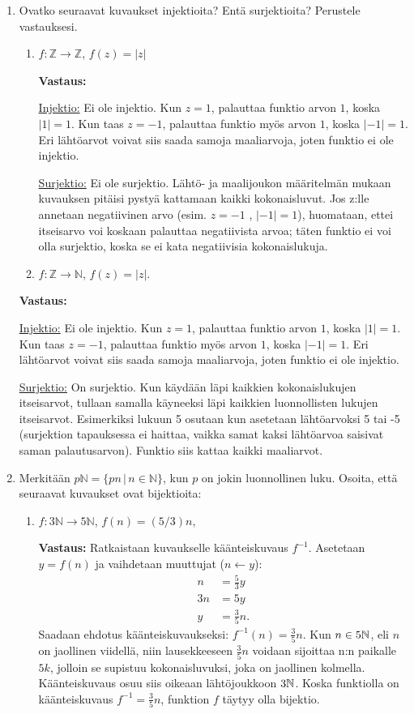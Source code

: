 \documentclass[a4paper,12pt]{article}
\begin{document}
\begin{enumerate}
\item Ovatko seuraavat kuvaukset injektioita? Ent\"a surjektioita? Perustele vastauksesi.
\begin{enumerate}
\item $f: \mathbb{Z} \to \mathbb{Z}$, $f(z)=\vert z \vert$

\textbf{Vastaus:} 

\underline{Injektio:} Ei ole injektio. Kun $z=1$, palauttaa funktio arvon $1$, koska $|1|=1$. Kun taas $z=-1$, palauttaa funktio myös arvon $1$, koska $|-1|=1$. Eri lähtöarvot voivat siis saada samoja maaliarvoja, joten funktio ei ole injektio. 

\underline{Surjektio:} Ei ole surjektio. Lähtö- ja maalijoukon määritelmän mukaan kuvauksen pitäisi pystyä kattamaan kaikki kokonaisluvut. Jos z:lle annetaan negatiivinen arvo (esim. $z=-1$ , $|-1| = 1$), huomataan, ettei itseisarvo voi koskaan palauttaa negatiivista arvoa; täten funktio ei voi olla surjektio, koska se ei kata negatiivisia kokonaislukuja. 

\item $f: \mathbb{Z} \to \mathbb{N}$, $f(z)=\vert z \vert$. \\
\end{enumerate}

\textbf{Vastaus:} 

\underline{Injektio:} Ei ole injektio. Kun $z=1$, palauttaa funktio arvon $1$, koska $|1|=1$. Kun taas $z=-1$, palauttaa funktio myös arvon $1$, koska $|-1|=1$. Eri lähtöarvot voivat siis saada samoja maaliarvoja, joten funktio ei ole injektio. 

\underline{Surjektio:} On surjektio. Kun käydään läpi kaikkien kokonaislukujen itseisarvot, tullaan samalla käyneeksi läpi kaikkien luonnollisten lukujen itseisarvot. Esimerkiksi lukuun 5 osutaan kun asetetaan lähtöarvoksi 5 tai -5 (surjektion tapauksessa ei haittaa, vaikka samat kaksi lähtöarvoa saisivat saman palautusarvon). Funktio siis kattaa kaikki maaliarvot. 

\item Merkit\"a\"an $p\mathbb{N}=\{pn \, | \, n \in \mathbb{N}\}$, kun $p$ on jokin luonnollinen luku.
Osoita, ett\"a seuraavat kuvaukset ovat bijektioita:
\begin{enumerate}
\item $f: 3\mathbb{N} \to 5\mathbb{N}$, $f(n)=(5/3)n$,

\textbf{Vastaus:} Ratkaistaan kuvaukselle käänteiskuvaus $f^{-1}$. Asetetaan $y=f(n)$ ja vaihdetaan muuttujat ($n \leftarrow y$):
\begin{align*}
    n&=\frac{5}{3}y\\
     3n&=5y\\
     y&=\frac{3}{5}n.
\end{align*}
Saadaan ehdotus käänteiskuvaukseksi: $f^{-1}(n) = \frac{3}{5}n$. Kun $n \in 5\mathbb{N}$, eli $n$ on jaollinen viidellä, niin lausekkeeseen $\frac{3}{5}n$ voidaan sijoittaa n:n paikalle $5k$, jolloin se supistuu kokonaisluvuksi, joka on jaollinen kolmella. Käänteiskuvaus osuu siis oikeaan lähtöjoukkoon $3\mathbb{N}$. Koska funktiolla on käänteiskuvaus $f^{-1} = \frac{3}{5}n$, funktion $f$ täytyy olla bijektio.  


\end{enumerate}
\end{enumerate}
\end{document}
